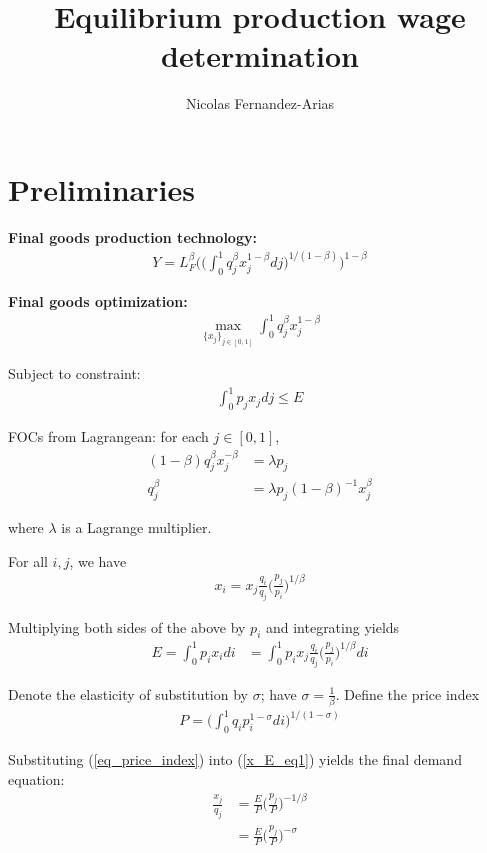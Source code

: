 \documentclass[12pt,english]{article}
\theoremstyle{remark}
\begin{document}
\title{Equilibrium production wage determination}
\author{Nicolas Fernandez-Arias}
\maketitle

\section{Preliminaries}
\textbf{Final goods production technology:}
\begin{align}
Y = L_F^{\beta}\Bigg( \Big(\int_0^1 q_j^{\beta} x_j^{1-\beta} dj \Big)^{1/(1-\beta)} \Bigg)^{1-\beta} \label{final_good_technology}
\end{align}

\textbf{Final goods optimization:}
\begin{align*}
\max_{\{x_j\}_{j\in [0,1]}} \int_0^1 q_j^{\beta} x_j^{1-\beta} 
\end{align*}

Subject to constraint:  
\begin{align*}
\int_0^1 p_j x_j dj \le E
\end{align*}

FOCs from Lagrangean: for each $j \in [0,1]$, 
\begin{align*}
(1-\beta)q_j^{\beta} x_j^{-\beta} &= \lambda p_j \\
					 q_j^{\beta}  &= \lambda p_j (1-\beta)^{-1} x_j^{\beta}
\end{align*}

where $\lambda$ is a Lagrange multiplier. 

For all $i,j$, we have 
\begin{align*}
x_i = x_j \frac{q_i}{q_j} \Big(\frac{p_j}{p_i}\Big)^{1/\beta}
\end{align*}

Multiplying both sides of the above by $p_i$ and integrating yields
\begin{align}
E = \int_0^1 p_i x_i di &= \int_0^1 p_i x_j \frac{q_i}{q_j} \Big(\frac{p_j}{p_i}\Big)^{1/\beta} di \label{x_E_eq1}
\end{align}

Denote the elasticity of substitution by $\sigma$; have $\sigma = \frac{1}{\beta}$. Define the price index
\begin{align}
P = \Big(\int_0^1 q_i p_i^{1-\sigma} di \Big)^{1/(1-\sigma)} \label{eq_price_index}
\end{align}

Substituting (\ref{eq_price_index}) into (\ref{x_E_eq1}) yields the final demand equation:
\begin{align}
\frac{x_j}{q_j} &= \frac{E}{P} \Big(\frac{p_j}{P}\Big)^{-1/\beta} \label{eq_x_demand_betaversion} \\
			    &= \frac{E}{P} \Big(\frac{p_j}{P}\Big)^{-\sigma} \label{eq_x_demand}
\end{align}
\end{document}
